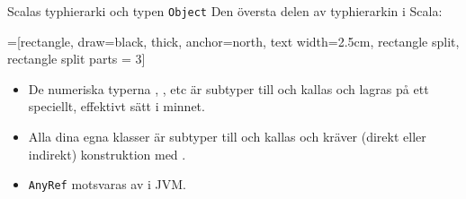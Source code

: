 \begin{Slide}{Scalas typhierarki och typen \texttt{Object}}
Den översta delen av typhierarkin i Scala:
\vspace{1em}
\begin{center}
\newcommand{\TextBox}[1]{\raisebox{0pt}[1em][0.5em]{#1}}
=[rectangle, draw=black,  thick, anchor=north, text width=2.5cm, rectangle split, rectangle split parts = 3]
\end{center}
\begin{itemize}\SlideFontSmall
\item De numeriska typerna , , etc är subtyper till  och kallas  och lagras på ett speciellt, effektivt sätt i minnet.
\item Alla dina egna klasser är subtyper till  och kallas  och kräver (direkt eller indirekt) konstruktion med .
\item \texttt{AnyRef} motsvaras av  i JVM.
\end{itemize}
\end{Slide}



